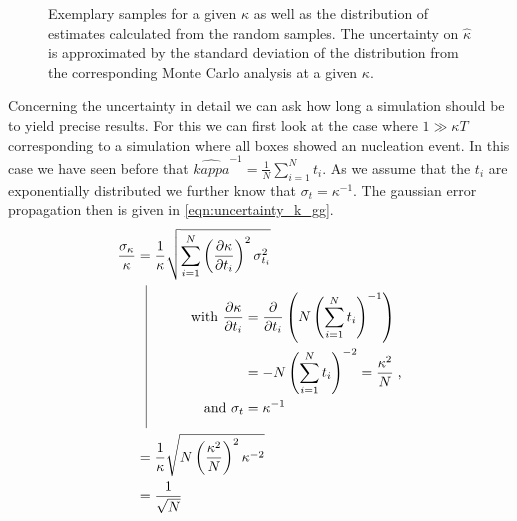 \begin{figure}[h]
\begin{center}
 \hspace{0.5cm}
\caption{Exemplary samples for a given $\kappa$ as well as the distribution of estimates calculated from the random samples. The uncertainty on $\hat{\kappa}$ is approximated by the standard deviation of the distribution from the corresponding Monte Carlo analysis at a given $\kappa$.}
\label{fig:mc_example}
\end{center}
\end{figure}
Concerning the uncertainty in detail we can ask how long a simulation should be to yield precise results. For this we can first look at the case where $1 \gg \kappa T$ corresponding to a simulation where all boxes showed an nucleation event. In this case we have seen before that $\hat{kappa}^{-1} = \frac{1}{N} \sum_{i=1}^N t_i$. As we assume that the $t_i$ are exponentially distributed we further know that $\sigma_{t} = \kappa^{-1}$. The gaussian error propagation then is given in \autoref{eqn:uncertainty_k_gg}.
\begin{align}
\label{eqn:uncertainty_k_gg}
\frac{\sigma_{\kappa}}{\kappa} &=\frac{1}{\kappa} \sqrt{\sum_{i=1}^N \left( \frac{\partial \kappa}{\partial t_i} \right)^2 \sigma_{t_i}^2 }\\ 
& \; \; \, \vrule
  \begin{aligned}[t]
  \raisebox{0.9cm}{ \makebox[1cm]{}} \text{with }  \frac{\partial \kappa}{\partial t_i} &= \frac{\partial}{\partial t_i} \left( N \left( \sum_{i=1}^N t_i \right)^{-1} \right)\\
  &= -N\left( \sum_{i=1}^N t_i \right)^{-2}  = \frac{\kappa^2}{N} \; \text{,} \\
 \raisebox{-0.4cm}{ \makebox[1cm]{}} \text{and } \sigma_{t} &= \kappa^{-1}
  \end{aligned} \nonumber\\
 &= \frac{1}{\kappa} \sqrt{ N \left( \frac{\kappa^2}{N}\right)^{2} \kappa^{-2} } \\
 &= \frac{1}{\sqrt{N}}
\end{align}

